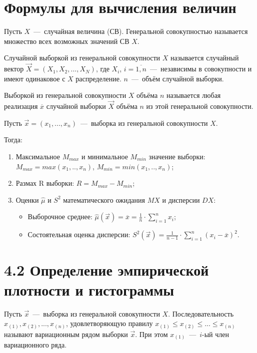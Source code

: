 \section{Формулы для вычисления величин}

Пусть $X$~---~случайная величина (СВ). Генеральной совокупностью называется множество всех возможных значений СВ $X$. 

Случайной выборкой из генеральной совокупности $X$ называется случайный вектор $\overrightarrow{X} = (X_1, X_2, ..., X_N)$, где $X_i$, $i = \overline{1, n}$~---~независимы в совокупности и имеют одинаковое с $X$ распределение. $n$~---~объём случайной выборки.

Выборкой из генеральной совокупности $X$ объёма $n$ называется любая реализация $\overline{x}$ случайной выборки $\overrightarrow{X}$ объёма $n$ из этой генеральной совокупности.

Пусть $\vec x=(x_1, ..., x_n)$~---~выборка из генеральной совокупности $X$.

Тогда:

\begin{enumerate}
 \item Максимальное $M_{max}$ и минимальное $M_{min}$ значение выборки: $M_{max} = max(x_1, .., x_n)$, $M_{min} = min(x_1, .., x_n)$;
 \item Размах R выборки: $R = M_{max} - M_{min}$;
 \item Оценки $\hat\mu$ и $S^2$ математического ожидания $MX$ и дисперсии $DX$:
  \begin{itemize}
   \item Выборочное среднее: $\hat\mu(\vec{x}) = \overline x = \frac{1}{n} \cdot \sum\limits_{i=1}^{n} x_i$;
   \item Состоятельная оценка дисперсии: $S^2(\vec{x}) = \frac{1}{n - 1} \cdot \sum\limits_{i=1}^{n} (x_i - \overline x)^2$.
  \end{itemize}
\end{enumerate}

\section*{4.2 Определение эмпирической плотности и гистограммы}

Пусть $\vec x$~---~выборка из генеральной совокупности $X$. Последовательность $x_{(1)}, x_{(2)}, ..., x_{(n)}$, удовлетворяющую правилу $x_{(1)} \leq x_{(2)} \leq ... \leq x_{(n)}$ называют вариационным рядом выборки $\vec x$. При этом $x_{(1)}$~---~$i$-ый член вариационного ряда.

